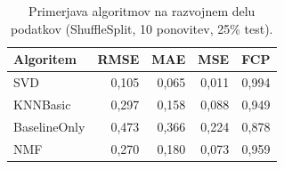 \begin{table}[htbp]
\centering
\caption{Primerjava algoritmov na razvojnem delu podatkov (ShuffleSplit, 10 ponovitev, 25\% test).}
\label{tab:algorithm_comparison}
\begin{tabular}{lrrrr}
\toprule
Algoritem & RMSE & MAE & MSE & FCP \\
\midrule
SVD & 0,105 & 0,065 & 0,011 & 0,994 \\
KNNBasic & 0,297 & 0,158 & 0,088 & 0,949 \\
BaselineOnly & 0,473 & 0,366 & 0,224 & 0,878 \\
NMF & 0,270 & 0,180 & 0,073 & 0,959 \\
\bottomrule
\end{tabular}

\end{table}
